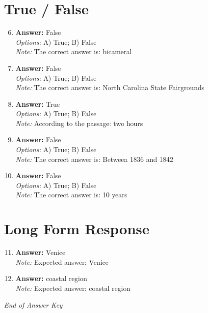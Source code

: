 \documentclass[12pt]{article}
\begin{document}
\section*{True / False}
\begin{enumerate}[label=\arabic*.]
\setcounter{enumi}{5}
\item \textbf{Answer:} False
\\ \textit{Options:} A) True; B) False
\\ \textit{Note:} The correct answer is: bicameral
\item \textbf{Answer:} False
\\ \textit{Options:} A) True; B) False
\\ \textit{Note:} The correct answer is: North Carolina State Fairgrounds
\item \textbf{Answer:} True
\\ \textit{Options:} A) True; B) False
\\ \textit{Note:} According to the passage: two hours
\item \textbf{Answer:} False
\\ \textit{Options:} A) True; B) False
\\ \textit{Note:} The correct answer is: Between 1836 and 1842
\item \textbf{Answer:} False
\\ \textit{Options:} A) True; B) False
\\ \textit{Note:} The correct answer is: 10 years
\end{enumerate}

\section*{Long Form Response}
\begin{enumerate}[label=\arabic*.]
\setcounter{enumi}{10}
\item \textbf{Answer:} Venice
\\ \textit{Note:} Expected answer: Venice
\item \textbf{Answer:} coastal region
\\ \textit{Note:} Expected answer: coastal region
\end{enumerate}

\vfill
\noindent\textit{End of Answer Key}
\end{document}
